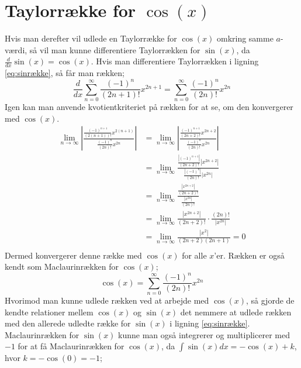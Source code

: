\section{Taylorrække for $\cos(x)$}
Hvis man derefter vil udlede en Taylorrække for $\cos(x)$ omkring samme $a$-værdi, så vil man kunne differentiere Taylorrækken for $\sin(x)$, da $\frac{d}{dx}\sin(x)=\cos(x)$. Hvis man differentiere Taylorrækken i ligning \ref{eq:sinrække}, så får man rækken;
\[
\frac{d}{dx} \sum_{n=0}^{\infty} \frac{(-1)^n}{(2n+1)!}x^{2n+1}
=
\sum_{n=0}^{\infty} \frac{(-1)^n}{(2n)!}x^{2n}
\]
Igen kan man anvende kvotientkriteriet på rækken for at se, om den konvergerer med $\cos(x)$.
\begin{align*}
\lim\limits_{n \to \infty}
\left\lvert
\frac{\frac{(-1)^{n+1}}{(2(n+1))!}x^{2(n+1)}}
{\frac{(-1)^n}{(2n)!}x^{2n}} 
\right\lvert
&=
\lim\limits_{n \to \infty}
\left\lvert
\frac{\frac{(-1)^{n+1}}{(2n+2)!}x^{2n+2}}
{\frac{(-1)^n}{(2n)!}x^{2n}}
\right\lvert 
\\
&=
\lim\limits_{n \to \infty}
\frac{\frac{\left\lvert (-1)^{n+1} \right\lvert }{(2n+2)!} \left\lvert x^{2n+2} \right\lvert }
{\frac{\left\lvert (-1)^n \right\lvert }{(2n)!} \left\lvert x^{2n} \right\lvert }
\\
&=
\lim\limits_{n \to \infty}
\frac{\frac{\left\lvert x^{2n+2} \right\lvert}{(2n+2)!}}
{\frac{\left\lvert x^{2n} \right\lvert}{(2n)!} }
\\
&=
\lim\limits_{n \to \infty}
\frac{\left\lvert x^{2n+2} \right\lvert}{(2n+2)!}
\cdot
\frac{(2n)!}{\left\lvert x^{2n} \right\lvert}
\\
&=
\lim\limits_{n \to \infty}
\frac{\left\lvert x^{2} \right\lvert}{(2n+2)(2n+1)}
=0 \\
\end{align*}
Dermed konvergerer denne række med $\cos(x)$ for alle $x$'er. Rækken er også kendt som Maclaurinrækken for $\cos(x)$;
\begin{equation}\label{eq:cosrække}
\cos(x)=\sum_{n=0}^{\infty} \frac{(-1)^n}{(2n)!}x^{2n}
\end{equation}
Hvorimod man kunne udlede rækken ved at arbejde med $\cos(x)$, så gjorde de kendte relationer mellem $\cos(x)$ og $\sin(x)$ det nemmere at udlede rækken med den allerede udledte række for $\sin(x)$ i ligning \ref{eq:sinrække}. Maclaurinrækken  for $\sin(x)$ kunne man også integrerer og multiplicerer med $-1$ for at få Maclaurinrækken for $\cos(x)$, da $\int \sin(x) dx=-\cos(x)+k$, hvor $k=-\cos(0)=-1$;

